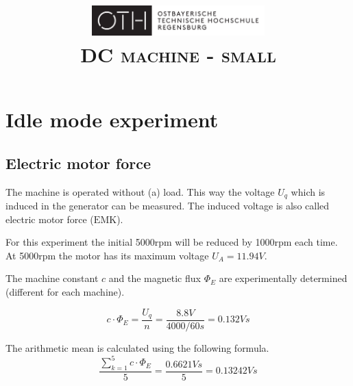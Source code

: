 \documentclass[conference]{IEEEtran}
\author{
    \IEEEauthorblockN{
        \textsc{Ayham Alhalaibi}
    }
    \and
    \IEEEauthorblockN{
        \textsc{Julia Blechle}
    }
    \and
    \IEEEauthorblockN{
        \textsc{Clara Huber}
    }
}
\begin{document}
\title{
    \centering
    \includegraphics[width=0.5\textwidth]{../OTHR_OTHR_Logo.pdf}\\
    \textsc{DC machine - small} \\
}

\maketitle

\begin{abstract}

\end{abstract}

\section{Idle mode experiment}
\subsection{Electric motor force}

The machine is operated without (a) load. This way the voltage $U_q$ which is
induced in the generator can be measured. The induced voltage is also called
electric motor force ($\mathrm{EMK}$).

For this experiment the initial 5000rpm will be reduced by 1000rpm each
time. At 5000rpm the motor has its maximum voltage $U_A = 11.94V$.

The machine constant $c$ and the magnetic flux $\Phi_E$ are experimentally
determined (different for each machine).

\begin{equation} \label{eq:machine_const}
    c \cdot \Phi_E = \frac{U_q}{n} = \frac{8.8\si{V}}{4000/60\si{s}} = 0.132\si{Vs}
\end{equation}

The arithmetic mean is calculated using the following formula.
\begin{equation}
    \frac{ \sum\limits_{k = 1}^{5} c \cdot \Phi_E}{5} = \frac{0.6621Vs}{5} = 0.13242Vs
\end{equation}



\end{document}
